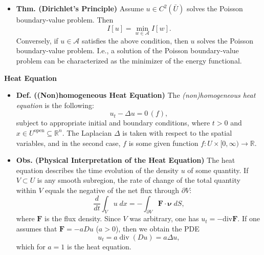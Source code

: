 \documentclass{article}
\renewcommand{\div}{\text{div}}
\begin{document}
\begin{itemize}
		\item \textbf{Thm. (Dirichlet's Principle)} Assume $u \in C^{2}(\bar{U})$ solves the Poisson boundary-value problem. Then 
		\begin{equation*}
			I[u] = \min_{w \in \mathcal{A}}I[w]. 
		\end{equation*}
		Conversely, if $u \in\mathcal{A}$ satisfies the above condition, then $u$ solves the Poisson boundary-value problem.  I.e., a solution of the Poisson boundary-value problem can be characterized as the minimizer of the energy functional. 
		
	\end{itemize}
	
	\textbf{Heat Equation}
	
	\begin{itemize}
		\item \textbf{Def. ((Non)homogeneous Heat Equation)} The \textit{(non)homogeneous heat equation} is the following:  
		\begin{equation*}
			u_{t} - \Delta u = 0 \hspace{2pt} (f), 
		\end{equation*}
		subject to appropriate initial and boundary conditions, where $t > 0$ and $x \in U^{\text{open}} \subseteq \mathbb{R}^{n}$. The Laplacian $\Delta$ is taken with respect to the spatial variables, and in the second case, $f$ is some given function $f: U \times [0,\infty) \to \mathbb{R}$. 
		
		\item \textbf{Obs. (Physical Interpretation of the Heat Equation)} The heat equation describes the time evolution of the density $u$ of some quantity. If $V \subset U$ is any smooth subregion, the rate of change of the total quantity within $V$ equals the negative of the net flux through $\partial V$: 
		\begin{equation*}
			\frac{d}{dt}\int_{V}u\;dx = -\int_{\partial V}\mathbf{F} \cdot \boldsymbol{\nu}\;dS, 
		\end{equation*}
		where $\mathbf{F}$ is the flux density. Since $V$ was arbitrary, one has $u_{t} = -\div{\mathbf{F}}$. If one assumes that $\mathbf{F} = -aDu$ ($a > 0$), then we obtain the PDE 
		\begin{equation*}
			u_{t} = a\operatorname{div}(Du) = a\Delta u, 
		\end{equation*}
		which for $a = 1$ is the heat equation. 
		

\end{itemize}
\end{document}
